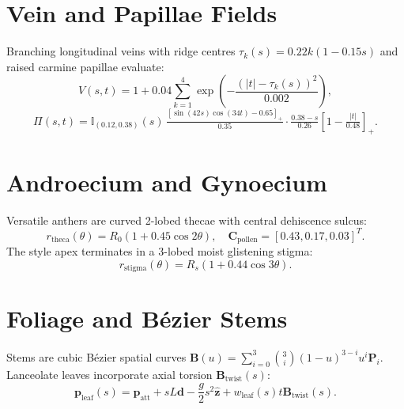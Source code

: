 \documentclass[10pt,twocolumn]{article}
\begin{document}
\section{Vein and Papillae Fields}
Branching longitudinal veins with ridge centres $\tau_k(s) = 0.22 k (1 - 0.15s)$ and raised carmine papillae evaluate:
\begin{equation}
V(s, t) = 1 + 0.04 \sum_{k=1}^4 \exp\left(-\frac{(|t| - \tau_k(s))^2}{0.002}\right),
\end{equation}
\begin{equation}
\Pi(s, t) = \mathbb{I}_{(0.12, 0.38)}(s)\,\tfrac{\left[\sin(42 s)\cos(34 t) - 0.65\right]_+}{0.35}\cdot\tfrac{0.38 - s}{0.26}\left[1 - \tfrac{|t|}{0.48}\right]_+.
\end{equation}

\section{Androecium and Gynoecium}
Versatile anthers are curved 2-lobed thecae with central dehiscence sulcus:
\begin{equation}
r_{\mathrm{theca}}(\theta) = R_0 (1 + 0.45 \cos 2\theta), \quad \mathbf{C}_{\mathrm{pollen}} = [0.43, 0.17, 0.03]^T.
\end{equation}
The style apex terminates in a 3-lobed moist glistening stigma:
\begin{equation}
r_{\mathrm{stigma}}(\theta) = R_s (1 + 0.44 \cos 3\theta).
\end{equation}

\section{Foliage and Bézier Stems}
Stems are cubic Bézier spatial curves $\mathbf{B}(u) = \sum_{i=0}^3 \binom{3}{i}(1-u)^{3-i}u^i \mathbf{P}_i$.
Lanceolate leaves incorporate axial torsion $\mathbf{B}_{\mathrm{twist}}(s)$:
\begin{equation}
\mathbf{p}_{\mathrm{leaf}}(s) = \mathbf{p}_{\mathrm{att}} + s L \mathbf{d} - \frac{g}{2} s^2 \hat{\mathbf{z}} + w_{\mathrm{leaf}}(s) t \mathbf{B}_{\mathrm{twist}}(s).
\end{equation}
\end{document}
